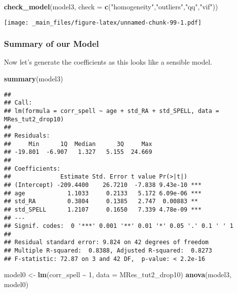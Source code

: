 \documentclass[
]{book}
\newenvironment{Shaded}{\begin{snugshade}}{\end{snugshade}}
\newcommand{\AttributeTok}[1]{\textcolor[rgb]{0.13,0.29,0.53}{#1}}
\newcommand{\DecValTok}[1]{\textcolor[rgb]{0.00,0.00,0.81}{#1}}
\newcommand{\FunctionTok}[1]{\textcolor[rgb]{0.13,0.29,0.53}{\textbf{#1}}}
\newcommand{\NormalTok}[1]{#1}
\newcommand{\OtherTok}[1]{\textcolor[rgb]{0.56,0.35,0.01}{#1}}
\newcommand{\SpecialCharTok}[1]{\textcolor[rgb]{0.81,0.36,0.00}{\textbf{#1}}}
\newcommand{\StringTok}[1]{\textcolor[rgb]{0.31,0.60,0.02}{#1}}
\begin{document}
\begin{Shaded}
\begin{Highlighting}[]
\FunctionTok{check\_model}\NormalTok{(model3, }\AttributeTok{check =} \FunctionTok{c}\NormalTok{(}\StringTok{"homogeneity"}\NormalTok{,}\StringTok{"outliers"}\NormalTok{,}\StringTok{"qq"}\NormalTok{,}\StringTok{"vif"}\NormalTok{))}
\end{Highlighting}
\end{Shaded}

\texttt{[image: \_main\_files/figure-latex/unnamed-chunk-99-1.pdf]}

\hypertarget{summary-of-our-model}{%
\subsubsection*{Summary of our Model}\label{summary-of-our-model}}

Now let's generate the coefficients as this looks like a sensible model.

\begin{Shaded}
\begin{Highlighting}[]
\FunctionTok{summary}\NormalTok{(model3)}
\end{Highlighting}
\end{Shaded}

\begin{verbatim}
## 
## Call:
## lm(formula = corr_spell ~ age + std_RA + std_SPELL, data = MRes_tut2_drop10)
## 
## Residuals:
##     Min      1Q  Median      3Q     Max 
## -19.801  -6.907   1.327   5.155  24.669 
## 
## Coefficients:
##              Estimate Std. Error t value Pr(>|t|)    
## (Intercept) -209.4400    26.7210  -7.838 9.43e-10 ***
## age            1.1033     0.2133   5.172 6.09e-06 ***
## std_RA         0.3804     0.1385   2.747  0.00883 ** 
## std_SPELL      1.2107     0.1650   7.339 4.78e-09 ***
## ---
## Signif. codes:  0 '***' 0.001 '**' 0.01 '*' 0.05 '.' 0.1 ' ' 1
## 
## Residual standard error: 9.824 on 42 degrees of freedom
## Multiple R-squared:  0.8388, Adjusted R-squared:  0.8273 
## F-statistic: 72.87 on 3 and 42 DF,  p-value: < 2.2e-16
\end{verbatim}

\begin{Shaded}
\begin{Highlighting}[]
\NormalTok{model0 }\OtherTok{\textless{}{-}} \FunctionTok{lm}\NormalTok{(corr\_spell }\SpecialCharTok{\textasciitilde{}} \DecValTok{1}\NormalTok{, }\AttributeTok{data =}\NormalTok{ MRes\_tut2\_drop10)}
\FunctionTok{anova}\NormalTok{(model3, model0)}
\end{Highlighting}
\end{Shaded}
\end{document}
